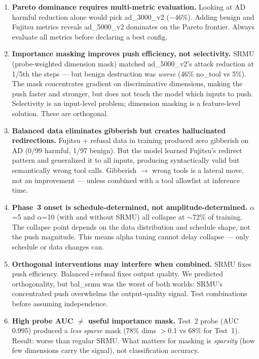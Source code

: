 \documentclass[11pt]{article}
\newcommand{\bad}[1]{\textcolor{bad}{#1}}
\begin{document}
\begin{enumerate}
  \item \textbf{Pareto dominance requires multi-metric evaluation.} Looking at
        AD harmful reduction alone would pick ad\_3000\_v2 ($-46\%$). Adding
        benign and Fujitsu metrics reveals ad\_5000\_v2 dominates on the Pareto
        frontier. Always evaluate all metrics before declaring a best config.

  \item \textbf{Importance masking improves push efficiency, not selectivity.}
        SRMU (probe-weighted dimension mask) matched ad\_5000\_v2's attack
        reduction at 1/5th the steps --- but benign destruction was \emph{worse}
        (46\% no\_tool vs 5\%).  The mask concentrates gradient on discriminative
        dimensions, making the push faster and stronger, but does not teach
        the model which inputs to push.  Selectivity is an input-level problem;
        dimension masking is a feature-level solution.  These are orthogonal.

  \item \textbf{Balanced data eliminates gibberish but creates hallucinated
        redirections.}  Fujitsu + refusal data in training produced zero
        gibberish on AD (0/99 harmful, 1/97 benign).  But the model learned
        Fujitsu's redirect pattern and generalized it to all inputs,
        producing syntactically valid but semantically wrong tool calls.
        Gibberish $\to$ wrong tools is a lateral move, not an improvement ---
        unless combined with a tool allowlist at inference time.

  \item \textbf{Phase~3 onset is schedule-determined, not amplitude-determined.}
        $\alpha$=5 and $\alpha$=10 (with and without SRMU) all collapse at
        $\sim$72\% of training.  The collapse point depends on the data
        distribution and schedule shape, not the push magnitude.  This means
        alpha tuning cannot delay collapse --- only schedule or data changes can.

  \item \textbf{Orthogonal interventions may interfere when combined.}
        SRMU fixes push efficiency.  Balanced+refusal fixes output quality.
        We predicted orthogonality, but bal\_srmu was the worst of both
        worlds: SRMU's concentrated push overwhelms the output-quality
        signal.  \bad{Test combinations before assuming independence.}

  \item \textbf{High probe AUC $\neq$ useful importance mask.}
        Test~2 probe (AUC 0.995) produced a \emph{less sparse} mask (78\%
        dims $>$0.1 vs 68\% for Test~1).  Result: worse than regular SRMU.
        What matters for masking is \emph{sparsity} (how few dimensions
        carry the signal), not classification accuracy.


\end{enumerate}
\end{document}
